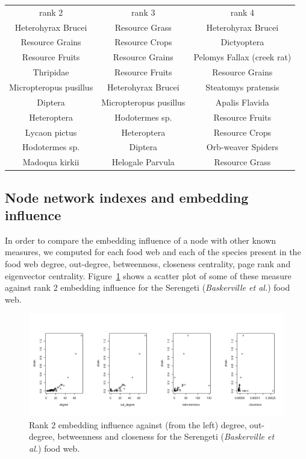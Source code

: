 \documentclass[12pt]{article}
\theoremstyle{definition}
\begin{document}
\begin{tabular}{c | c | c}\label{tab:deVis}
rank 2 & rank 3 & rank 4\\
Heterohyrax Brucei & Resource Grass & Heterohyrax Brucei\\
Resource Grains & Resource Crops & Dictyoptera\\
Resource Fruits & Resource Grains & Pelomys Fallax (creek rat)\\
Thripidae &  Resource Fruits & Resource Grains\\
Micropteropus pusillus & Heterohyrax Brucei & Steatomys pratensis\\
Diptera & Micropteropus pusillus & Apalis Flavida\\
Heteroptera & Hodotermes sp. & Resource Fruits\\
Lycaon pictus & Heteroptera & Resource Crops\\
Hodotermes sp. & Diptera & Orb-weaver Spiders\\
Madoqua kirkii & Helogale Parvula & Resource Grass
\end{tabular}

 

\subsection{Node network indexes and embedding influence}

In order to compare the embedding influence of a node with other known measures, we computed for each food web and each of the species present in the food web degree, out-degree, betweenness, closeness centrality, page rank and eigenvector centrality. Figure~\ref{fig:Scatter_S_B_2} shows a scatter plot of some of these measure against rank 2 embedding influence for the Serengeti (\textit{Baskerville et al.}) food web.

\begin{figure}[!ht]
\centering
\includegraphics[width=\textwidth]{Images/Scatter_S_B_2.png}
\caption{Rank 2 embedding influence against (from the left) degree, out-degree, betweenness and closeness for the Serengeti (\textit{Baskerville et al.}) food web.}\label{fig:Scatter_S_B_2}
\end{figure}
\end{document}
